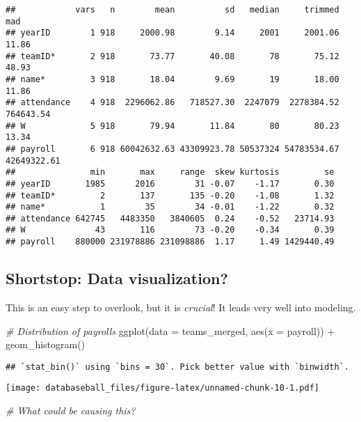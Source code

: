 \documentclass[
]{article}
\newenvironment{Shaded}{\begin{snugshade}}{\end{snugshade}}
\newcommand{\AttributeTok}[1]{\textcolor[rgb]{0.77,0.63,0.00}{#1}}
\newcommand{\CommentTok}[1]{\textcolor[rgb]{0.56,0.35,0.01}{\textit{#1}}}
\newcommand{\FunctionTok}[1]{\textcolor[rgb]{0.00,0.00,0.00}{#1}}
\newcommand{\NormalTok}[1]{#1}
\newcommand{\SpecialCharTok}[1]{\textcolor[rgb]{0.00,0.00,0.00}{#1}}
\begin{document}
\begin{verbatim}
##            vars   n        mean          sd   median     trimmed         mad
## yearID        1 918     2000.98        9.14     2001     2001.06       11.86
## teamID*       2 918       73.77       40.08       78       75.12       48.93
## name*         3 918       18.04        9.69       19       18.00       11.86
## attendance    4 918  2296062.86   718527.30  2247079  2278384.52   764643.54
## W             5 918       79.94       11.84       80       80.23       13.34
## payroll       6 918 60042632.63 43309923.78 50537324 54783534.67 42649322.61
##               min       max     range  skew kurtosis         se
## yearID       1985      2016        31 -0.07    -1.17       0.30
## teamID*         2       137       135 -0.20    -1.08       1.32
## name*           1        35        34 -0.01    -1.22       0.32
## attendance 642745   4483350   3840605  0.24    -0.52   23714.93
## W              43       116        73 -0.20    -0.34       0.39
## payroll    880000 231978886 231098886  1.17     1.49 1429440.49
\end{verbatim}

\hypertarget{shortstop-data-visualization}{%
\subsection{Shortstop: Data
visualization?}\label{shortstop-data-visualization}}

This is an easy step to overlook, but it is \emph{crucial}! It leads
very well into modeling.

\begin{Shaded}
\begin{Highlighting}[]
\CommentTok{\# Distribution of payrolls}
\FunctionTok{ggplot}\NormalTok{(}\AttributeTok{data =}\NormalTok{ teams\_merged, }\FunctionTok{aes}\NormalTok{(}\AttributeTok{x =}\NormalTok{ payroll)) }\SpecialCharTok{+}
  \FunctionTok{geom\_histogram}\NormalTok{()}
\end{Highlighting}
\end{Shaded}

\begin{verbatim}
## `stat_bin()` using `bins = 30`. Pick better value with `binwidth`.
\end{verbatim}

\texttt{[image: databaseball\_files/figure-latex/unnamed-chunk-10-1.pdf]}

\begin{Shaded}
\begin{Highlighting}[]
\CommentTok{\# What could be causing this?}
\end{Highlighting}
\end{Shaded}
\end{document}

